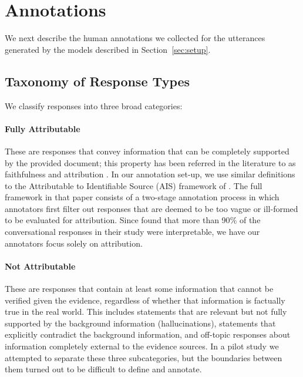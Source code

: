 



\section{Annotations}

We next describe the human annotations we collected for the utterances generated by the models described in Section~\ref{sec:setup}.

\subsection{Taxonomy of Response Types}
We classify responses into three broad categories:

\paragraph{Fully Attributable}  These are responses that convey information that can be completely supported by the provided document; this property has been referred in the literature to as faithfulness  \cite{rashkin-etal-2021-increasing,maynez2020faithfulness, dziri-etal-2021-neural,durmus-etal-2020-feqa} and attribution \cite{rashkin2021measuring}.  In our annotation set-up, we use similar definitions to the Attributable to Identifiable Source (AIS) framework of \citet{rashkin2021measuring}.  The full framework in that paper consists of a two-stage annotation process in which annotators first filter out responses that are deemed to be too vague or ill-formed to be evaluated for attribution. Since  \citet{rashkin2021measuring} found that more than 90$\%$ of the conversational responses in their study were interpretable, we have our annotators focus solely on attribution.



\paragraph{Not Attributable} These are responses that contain at least some information that cannot be verified given the evidence, regardless of whether that information is factually true in the real world.  This includes statements that are  relevant but not fully supported by the background information (hallucinations), statements that explicitly contradict the background information, and off-topic responses about information completely external to the evidence sources. In a pilot study we attempted to separate these three subcategories, but the boundaries between them turned out to be difficult to define and annotate.


